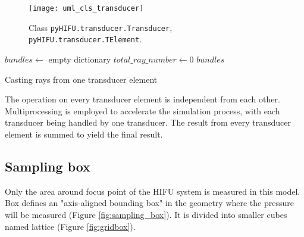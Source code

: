 \begin{figure}[h]
    \centering
    \texttt{[image: uml\_cls\_transducer]}
    \caption{Class \texttt{pyHIFU.transducer.Transducer}, \texttt{pyHIFU.transducer.TElement}.}
    \label{fig:uml_cls_transducer}
\end{figure}

\IncMargin{1em}
\begin{algorithm}[H]
    \DontPrintSemicolon
    $bundles \leftarrow$ empty dictionary\;
    $total\_ray\_number \leftarrow 0$\;
    \Return $bundles$
    \caption{Casting rays from one transducer element}\label{algo_disjdecomp}
\end{algorithm}
\DecMargin{1em}

The operation on every transducer element is independent from each other. Multiprocessing is employed to accelerate the simulation process, with each transducer being handled by one transducer. The result from every transducer element is summed to yield the final result.

\subsection{Sampling box}
Only the area around focus point of the HIFU system is measured in this model. Box defines an "axis-aligned bounding box" in the geometry where the pressure will be measured (Figure \ref{fig:sampling_box}). It is divided into smaller cubes named lattice (Figure \ref{fig:gridbox}).

